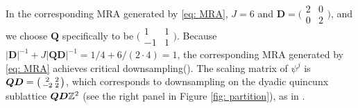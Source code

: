 In the corresponding MRA generated by \eqref{eq: MRA}, $J=6$ and $\mathbf{D} =\bigl(\begin{smallmatrix} 2&0\\0&2\end{smallmatrix}\bigr)$, and we choose  $\mathbf{Q}$ specifically to be $\bigl(\begin{smallmatrix} 1&1\\-1&1\end{smallmatrix}\bigr)$. Because $ |\mathbf{D}|^{-1} + J|\mathbf{QD}|^{-1} = 1/4 + 6/ (2\cdot 4) = 1$, the corresponding MRA generated by \eqref{eq: MRA} achieves critical downsampling(\cite{durand2007}). The scaling matrix of $\psi^j$ is $\boldsymbol{QD}=\bigl(\begin{smallmatrix} 2 & 2\\-2 & 2\end{smallmatrix}\bigr)$, which corresponds to downsampling on the dyadic quincunx sublattice $\boldsymbol{QD}\mathbb{Z}^2$ (see the right panel in Figure \ref{fig: partition}), as in \cite{durand2007}. 


